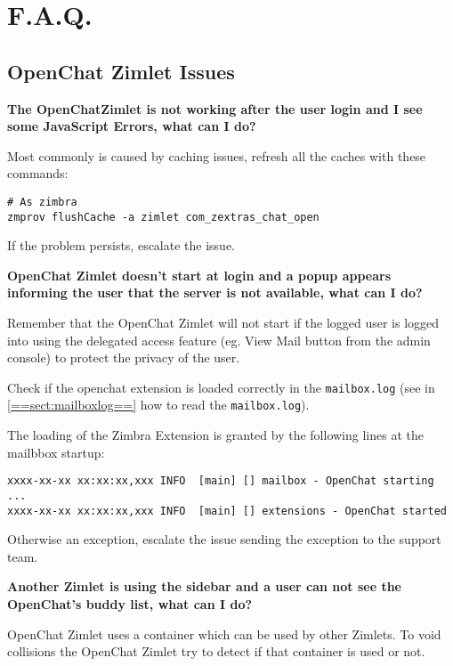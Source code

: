 \section{F.A.Q.}
\label{==sect:faq==}

    \subsection[Zimlet Issues]{OpenChat Zimlet Issues}

    \textbf{The OpenChatZimlet is not working after the user login and I see some JavaScript Errors, what can I do?}

        Most commonly is caused by caching issues, refresh all the caches with these commands:
        \begin{verbatim}
# As zimbra
zmprov flushCache -a zimlet com_zextras_chat_open
        \end{verbatim}
        If the problem persists, escalate the issue.

    \textbf{OpenChat Zimlet doesn’t start at login and a popup appears informing the user that the server is not
    available, what can I do?}

\begin{comment}
TIP:
\end{comment}
        \begin{info}
            Remember that the OpenChat Zimlet will not start if the logged user is logged into using the delegated access
            feature (eg. View Mail button from the admin console) to protect the privacy of the user.
        \end{info}

        Check if the openchat extension is loaded correctly in the \verb+mailbox.log+ (see in \ref{==sect:mailboxlog==}
        how to read the \verb+mailbox.log+).

        The loading of the Zimbra Extension is granted by the following lines at the mailbbox startup:
        \begin{verbatim}
xxxx-xx-xx xx:xx:xx,xxx INFO  [main] [] mailbox - OpenChat starting ...
xxxx-xx-xx xx:xx:xx,xxx INFO  [main] [] extensions - OpenChat started
        \end{verbatim}
        Otherwise an exception, escalate the issue sending the exception to the support team.

    \textbf{Another Zimlet is using the sidebar and a user can not see the OpenChat's buddy list, what can I do?}

        OpenChat Zimlet uses a container which can be used by other Zimlets. To void collisions the OpenChat Zimlet try
        to detect if that container is used or not.


